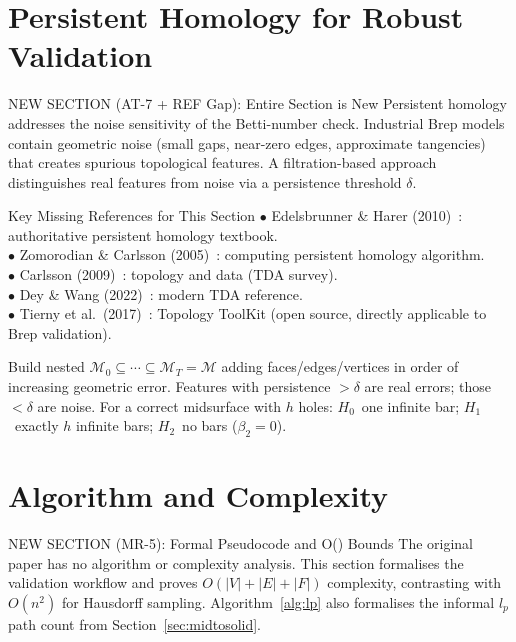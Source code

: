 \documentclass[journal,twocolumn,10pt]{IEEEtran}
\newcommand{\Hk}[1]{H_{#1}}
\newcommand{\Betti}[1]{\beta_{#1}}
\begin{document}
\section{Persistent Homology for Robust Validation}\label{sec:persistent}

\begin{addblock}{NEW SECTION (AT-7 + REF Gap): Entire Section is New}
Persistent homology addresses the noise sensitivity of the Betti-number check.
Industrial Brep models contain geometric noise (small gaps, near-zero edges,
approximate tangencies) that creates spurious topological features. A
filtration-based approach distinguishes real features from noise via a
persistence threshold $\delta$.
\end{addblock}

\begin{refblock}{Key Missing References for This Section}
$\bullet$ Edelsbrunner \& Harer (2010)~\cite{Edelsbrunner2010}: authoritative
  persistent homology textbook.\\
$\bullet$ Zomorodian \& Carlsson (2005)~\cite{Zomorodian2005}: computing
  persistent homology algorithm.\\
$\bullet$ Carlsson (2009)~\cite{Carlsson2009}: topology and data (TDA survey).\\
$\bullet$ Dey \& Wang (2022)~\cite{DeyWang2022}: modern TDA reference.\\
$\bullet$ Tierny et al.\ (2017)~\cite{Tierny2017}: Topology ToolKit (open
  source, directly applicable to Brep validation).
\end{refblock}

Build nested $\mathcal{M}_0\subseteq\cdots\subseteq\mathcal{M}_T=\mathcal{M}$
adding faces/edges/vertices in order of increasing geometric error.
Features with persistence $>\delta$ are real errors; those $<\delta$ are noise.
For a correct midsurface with $h$ holes: $\Hk{0}$~one infinite bar;
$\Hk{1}$~exactly $h$ infinite bars; $\Hk{2}$~no bars ($\Betti{2}=0$).

\section{Algorithm and Complexity}\label{sec:algorithm}

\begin{addblock}{NEW SECTION (MR-5): Formal Pseudocode and O() Bounds}
The original paper has no algorithm or complexity analysis. This section
formalises the validation workflow and proves $O(|V|+|E|+|F|)$ complexity,
contrasting with $O(n^2)$ for Hausdorff sampling. Algorithm~\ref{alg:lp}
also formalises the informal $l_p$ path count from Section~\ref{sec:midtosolid}.
\end{addblock}
\end{document}
